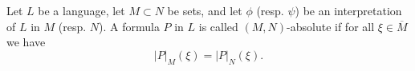 Let $L$ be a language, let $M \subset N$ be sets, and let $\phi$ (resp. $\psi$) be an interpretation of $L$ in $M$ (resp. $N$). A formula $P$ in $L$ is called $(M,N)$-absolute if for all $\xi \in \overline{M}$ we have
$$|P|_M(\xi) = |P|_N(\xi).$$
